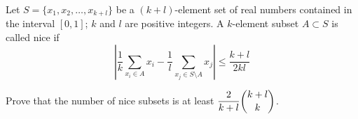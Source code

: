 Let $ S = \{x_1, x_2, \ldots, x_{k + l}\}$ be a $ (k + l)$-element set of real numbers contained in the interval $ [0, 1]$; $ k$ and $ l$ are positive integers. A $ k$-element subset $ A\subset S$ is called nice if\[ \left |\frac {1}{k}\sum_{x_i\in A} x_i - \frac {1}{l}\sum_{x_j\in S\setminus A} x_j\right |\le \frac {k + l}{2kl}\]

Prove that the number of nice subsets is at least $ \dfrac{2}{k + l}\dbinom{k + l}{k}$.